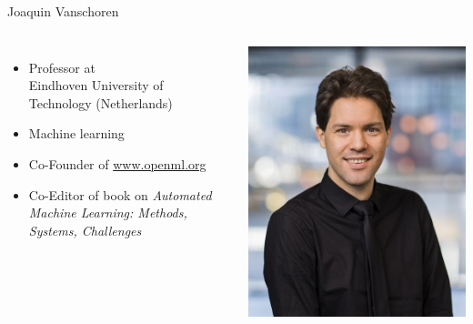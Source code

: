 \begin{frame}[c]{Joaquin Vanschoren}



\begin{columns}
	
	
	\begin{itemize}
		\item Professor at\\ Eindhoven University of Technology (Netherlands)
		\item Machine learning 
		\item Co-Founder of \url{www.openml.org}
    	\item Co-Editor of book on \textit{Automated Machine Learning:	Methods, Systems, Challenges}
	\end{itemize}
	
	
	\includegraphics[width=1.0\textwidth]{images/vanschoren.jpg}
	
\end{columns}


\end{frame}


